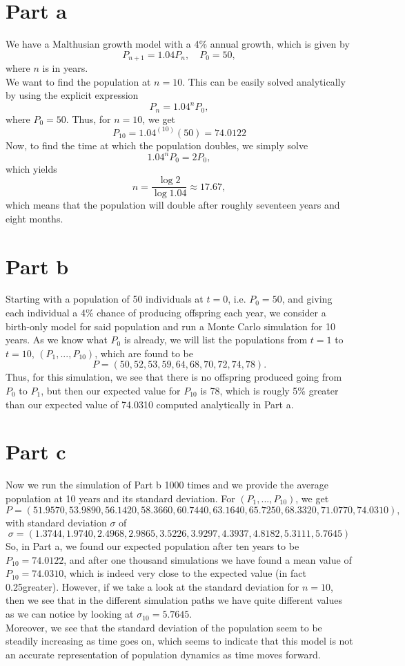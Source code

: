\section{Part a}
We have a Malthusian growth model with a 4\% annual growth, which is given by
$$
P_{n+1} = 1.04P_{n}, \quad P_{0}= 50,
$$
where $n$ is in years.\\
We want to find the population at $n=10$. This can be easily solved analytically by using the explicit expression
$$
P_{n} = 1.04^{n}P_{0},
$$
where $P_{0} = 50$.
Thus, for $n=10$, we get
$$
P_{10}=1.04^{(10)}(50)=74.0122
$$
Now, to find the time at which the population doubles, we simply solve
$$
1.04^{n}P_{0}=2P_{0},
$$
which yields
$$
n = \frac{\log2}{\log1.04} \approx 17.67,
$$
which means that the population will double after roughly seventeen years and eight months.\\

\section{Part b}
Starting with a population of 50 individuals at $t=0$, i.e. $P_{0}=50$, and giving each individual a 4\% chance of producing offspring each year, we consider a birth-only model for said population and run a Monte Carlo simulation for 10 years. As we know what $P_{0}$ is already, we will list the populations from $t=1$ to $t=10$, $(P_{1},...,P_{10})$, which are found to be
$$
P = (50, 52, 53, 59, 64, 68, 70, 72, 74, 78).
$$
Thus, for this simulation, we see that there is no offspring produced going from $P_{0}$ to $P_{1}$, but then our expected value for $P_{10}$ is 78, which is rougly 5\% greater than our expected value of 74.0310 computed analytically in Part a.

\section{Part c}
Now we run the simulation of Part b 1000 times and we provide the average population at 10 years and its standard deviation.
For $(P_{1},...,P_{10})$, we get
$$
P =(51.9570, 53.9890, 56.1420, 58.3660, 60.7440, 63.1640, 65.7250, 68.3320, 71.0770, 74.0310),
$$
with standard deviation $\sigma$ of
$$
\sigma = (1.3744, 1.9740, 2.4968, 2.9865, 3.5226, 3.9297, 4.3937, 4.8182, 5.3111, 5.7645)
$$
So, in Part a, we found our expected population after ten years to be $P_{10} = 74.0122$,
and after one thousand simulations we have found a mean value of $P_{10}=74.0310$, which is indeed very close to the expected value (in fact 0.25\permil\quad greater). However, if we take a look at the standard deviation for $n=10$, then we see that in the different simulation paths we have quite different values as we can notice by looking at $\sigma_{10}=5.7645$.\\ Moreover, we see that the standard deviation of the population seem to be steadily increasing as time goes on, which seems to indicate that this model is not an accurate representation of population dynamics as time moves forward.